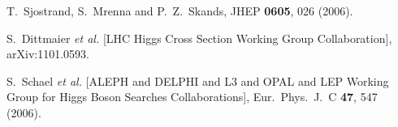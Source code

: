 \documentclass[aps,prl,twocolumn,preprintnumbers,groupedaddress,nofootinbib]{revtex4}
\begin{document}
\begin{thebibliography}{99}
  T.~Sjostrand, S.~Mrenna and P.~Z.~Skands,
  JHEP {\bf 0605}, 026 (2006).

  S.~Dittmaier {\it et al.}  [LHC Higgs Cross Section Working Group Collaboration],
  arXiv:1101.0593. %

  S.~Schael {\it et al.}  [ALEPH and DELPHI and L3 and OPAL and LEP Working Group for Higgs Boson Searches Collaborations],
  Eur.\ Phys.\ J.\ C {\bf 47}, 547 (2006).
\end{thebibliography}
\end{document}

